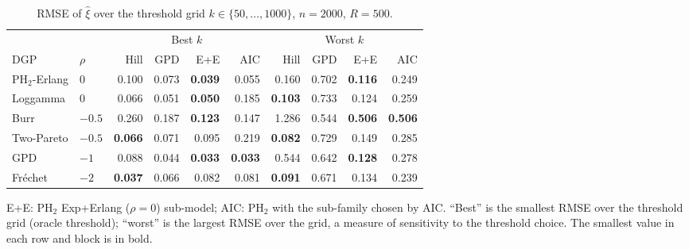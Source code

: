 \begin{table}[t]
\centering
\footnotesize
\setlength{\tabcolsep}{4pt}
\caption{RMSE of $\hat\xi$ over the threshold grid $k\in\{50,\dots,1000\}$, $n=2000$, $R=500$.}
\label{tab:xi2000}
\begin{tabular}{llrrrrrrrr}
\toprule
 & & \multicolumn{4}{c}{Best $k$} & \multicolumn{4}{c}{Worst $k$} \\
\cmidrule(lr){3-6} \cmidrule(lr){7-10}
DGP & $\rho$ & Hill & GPD & E+E & AIC & Hill & GPD & E+E & AIC \\
\midrule
PH$_2$-Erlang & $0$ & 0.100 & 0.073 & \textbf{0.039} & 0.055 & 0.160 & 0.702 & \textbf{0.116} & 0.249 \\
Loggamma & $0$ & 0.066 & 0.051 & \textbf{0.050} & 0.185 & \textbf{0.103} & 0.733 & 0.124 & 0.259 \\
Burr & $-0.5$ & 0.260 & 0.187 & \textbf{0.123} & 0.147 & 1.286 & 0.544 & \textbf{0.506} & \textbf{0.506} \\
Two-Pareto & $-0.5$ & \textbf{0.066} & 0.071 & 0.095 & 0.219 & \textbf{0.082} & 0.729 & 0.149 & 0.285 \\
GPD & $-1$ & 0.088 & 0.044 & \textbf{0.033} & \textbf{0.033} & 0.544 & 0.642 & \textbf{0.128} & 0.278 \\
Fr\'echet & $-2$ & \textbf{0.037} & 0.066 & 0.082 & 0.081 & \textbf{0.091} & 0.671 & 0.134 & 0.239 \\
\bottomrule
\end{tabular}
\par\smallskip
\parbox{\linewidth}{\footnotesize E+E: PH$_2$ Exp+Erlang ($\rho=0$) sub-model; AIC: PH$_2$ with the sub-family chosen by AIC. ``Best'' is the smallest RMSE over the threshold grid (oracle threshold); ``worst'' is the largest RMSE over the grid, a measure of sensitivity to the threshold choice. The smallest value in each row and block is in bold.}
\end{table}
